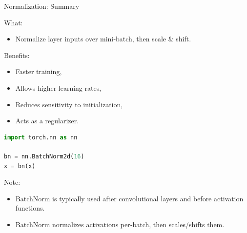 \begin{frame}[fragile]{Normalization: Summary}
\begin{block}{What:}
    \begin{itemize}
        \item Normalize layer inputs over mini‑batch, then scale & shift.
    \end{itemize}
\end{block}

\begin{block}{Benefits:}
    \begin{itemize}
        \item Faster training,
        \item Allows higher learning rates,
        \item Reduces sensitivity to initialization,
        \item Acts as a regularizer.
    \end{itemize}
\end{block}

\begin{lstlisting}[language=Python, caption={Code snippet (PyTorch)}, basicstyle=\ttfamily\footnotesize]
import torch.nn as nn

bn = nn.BatchNorm2d(16)
x = bn(x)
\end{lstlisting}

\begin{block}{Note:}
    \begin{itemize}
        \item BatchNorm is typically used after convolutional layers and before activation functions.
        \item BatchNorm normalizes activations per‑batch, then scales/shifts them. 
    \end{itemize}
\end{block}
\end{frame}  

